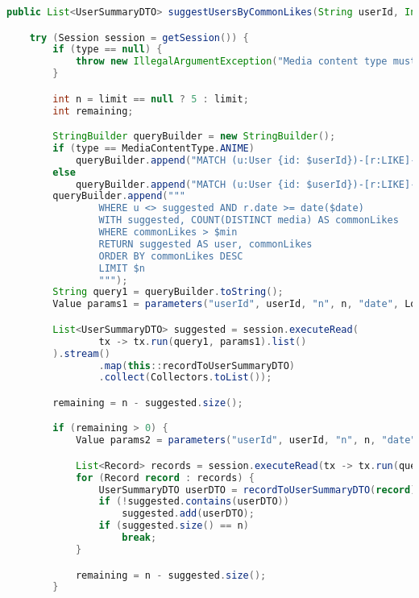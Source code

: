 \begin{mdframed}[style=customstyle]
\begin{lstlisting}[language=java]
public List<UserSummaryDTO> suggestUsersByCommonLikes(String userId, Integer limit, MediaContentType type) throws DAOException {

    try (Session session = getSession()) {
        if (type == null) {
            throw new IllegalArgumentException("Media content type must be specified");
        }

        int n = limit == null ? 5 : limit;
        int remaining;

        StringBuilder queryBuilder = new StringBuilder();
        if (type == MediaContentType.ANIME)
            queryBuilder.append("MATCH (u:User {id: $userId})-[r:LIKE]->(media:Anime)<-[:LIKE]-(suggested:User) ");
        else
            queryBuilder.append("MATCH (u:User {id: $userId})-[r:LIKE]->(media:Manga)<-[:LIKE]-(suggested:User) ");
        queryBuilder.append("""
                WHERE u <> suggested AND r.date >= date($date)
                WITH suggested, COUNT(DISTINCT media) AS commonLikes
                WHERE commonLikes > $min
                RETURN suggested AS user, commonLikes
                ORDER BY commonLikes DESC
                LIMIT $n
                """);
        String query1 = queryBuilder.toString();
        Value params1 = parameters("userId", userId, "n", n, "date", LocalDate.now().minusMonths(6), "min", 5);

        List<UserSummaryDTO> suggested = session.executeRead(
                tx -> tx.run(query1, params1).list()
        ).stream()
                .map(this::recordToUserSummaryDTO)
                .collect(Collectors.toList());

        remaining = n - suggested.size();

        if (remaining > 0) {
            Value params2 = parameters("userId", userId, "n", n, "date", LocalDate.now().minusYears(1), "min", 5);

            List<Record> records = session.executeRead(tx -> tx.run(query1, params2).list());
            for (Record record : records) {
                UserSummaryDTO userDTO = recordToUserSummaryDTO(record);
                if (!suggested.contains(userDTO))
                    suggested.add(userDTO);
                if (suggested.size() == n)
                    break;
            }

            remaining = n - suggested.size();
        }


\end{lstlisting}
\end{mdframed}
